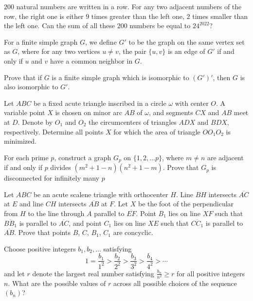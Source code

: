 \documentclass[11pt]{scrartcl}
\begin{document}
\begin{problem}[6135851041251773220]
$200$ natural numbers are written in a row. For any two adjacent numbers of the row, the right one is either $9$ times greater than the left one, $2$ times smaller than the left one. Can the sum of all these 200 numbers be equal to $24^{2022}$?
\end{problem}
\begin{problem}[8489819892706651399]
For a finite simple graph $G$, we define $G'$ to be the graph on the same vertex set as $G$, where for any two vertices $u \neq v$, the pair $\{u,v\}$ is an edge of $G'$ if and only if $u$ and $v$ have a common neighbor in $G$.

Prove that if $G$ is a finite simple graph which is isomorphic to $(G')'$, then $G$ is also isomorphic to $G'$.
\end{problem}
\begin{problem}[213513857758059]
Let $ABC$ be a fixed acute triangle inscribed in a circle $\omega$ with center $O$. A variable point $X$ is chosen on minor arc $AB$ of $\omega$, and segments $CX$ and $AB$ meet at $D$. Denote by $O_1$ and $O_2$ the circumcenters of triangles $ADX$ and $BDX$, respectively. Determine all points $X$ for which the area of triangle $OO_1O_2$ is minimized.
\end{problem}
\begin{problem}[409146991986056]
For each prime $p$, construct a graph $G_p$ on $\{1,2,\ldots p\}$, where $m\neq n$ are adjacent if and only if $p$ divides $(m^{2} + 1-n)(n^{2} + 1-m)$. Prove that $G_p$ is disconnected for infinitely many $p$
\end{problem}
\begin{problem}[15595788767204175]
Let \(ABC\) be an acute scalene triangle with orthocenter \(H\). Line \(BH\) intersects \(\overline{AC}\) at \(E\) and line \(CH\) intersects \(\overline{AB}\) at \(F\). Let \(X\) be the foot of the perpendicular from \(H\) to the line through \(A\) parallel to \(\overline{EF}\). Point \(B_1\) lies on line \(XF\) such that \(\overline{BB_1}\) is parallel to \(\overline{AC}\), and point \(C_1\) lies on line \(XE\) such that \(\overline{CC_1}\) is parallel to \(\overline{AB}\). Prove that points \(B\), \(C\), \(B_1\), \(C_1\) are concyclic.
\end{problem}
\begin{problem}[6666334949338369993]
	Choose positive integers $b_1, b_2, \dotsc$ satisfying
\[1=\frac{b_1}{1^2} > \frac{b_2}{2^2} > \frac{b_3}{3^2} > \frac{b_4}{4^2} > \dotsb\]and let $r$ denote the largest real number satisfying $\tfrac{b_n}{n^2} \geq r$ for all positive integers $n$. What are the possible values of $r$ across all possible choices of the sequence $(b_n)$?
\end{problem}
\end{document}
